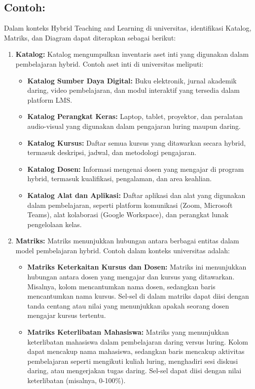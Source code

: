 \subsection{Contoh:}
Dalam konteks Hybrid Teaching and Learning di universitas, identifikasi Katalog, Matriks, dan Diagram dapat diterapkan sebagai berikut:

\begin{enumerate}
	\item \textbf{Katalog:}  
	Katalog mengumpulkan inventaris aset inti yang digunakan dalam pembelajaran hybrid. Contoh aset inti di universitas meliputi:
	\begin{itemize}
		\item \textbf{Katalog Sumber Daya Digital:} Buku elektronik, jurnal akademik daring, video pembelajaran, dan modul interaktif yang tersedia dalam platform LMS.
		\item \textbf{Katalog Perangkat Keras:} Laptop, tablet, proyektor, dan peralatan audio-visual yang digunakan dalam pengajaran luring maupun daring.
		\item \textbf{Katalog Kursus:} Daftar semua kursus yang ditawarkan secara hybrid, termasuk deskripsi, jadwal, dan metodologi pengajaran.
		\item \textbf{Katalog Dosen:} Informasi mengenai dosen yang mengajar di program hybrid, termasuk kualifikasi, pengalaman, dan area keahlian.
		\item \textbf{Katalog Alat dan Aplikasi:} Daftar aplikasi dan alat yang digunakan dalam pembelajaran, seperti platform komunikasi (Zoom, Microsoft Teams), alat kolaborasi (Google Workspace), dan perangkat lunak pengelolaan kelas.
	\end{itemize}
	
	\item \textbf{Matriks:}  
	Matriks menunjukkan hubungan antara berbagai entitas dalam model pembelajaran hybrid. Contoh dalam konteks universitas adalah:
	\begin{itemize}
		\item \textbf{Matriks Keterkaitan Kursus dan Dosen:} Matriks ini menunjukkan hubungan antara dosen yang mengajar dan kursus yang ditawarkan. Misalnya, kolom mencantumkan nama dosen, sedangkan baris mencantumkan nama kursus. Sel-sel di dalam matriks dapat diisi dengan tanda centang atau nilai yang menunjukkan apakah seorang dosen mengajar kursus tertentu.
		
		\item \textbf{Matriks Keterlibatan Mahasiswa:} Matriks yang menunjukkan keterlibatan mahasiswa dalam pembelajaran daring versus luring. Kolom dapat mencakup nama mahasiswa, sedangkan baris mencakup aktivitas pembelajaran seperti mengikuti kuliah luring, menghadiri sesi diskusi daring, atau mengerjakan tugas daring. Sel-sel dapat diisi dengan nilai keterlibatan (misalnya, 0-100\%).
		

\end{itemize}
\end{enumerate}
